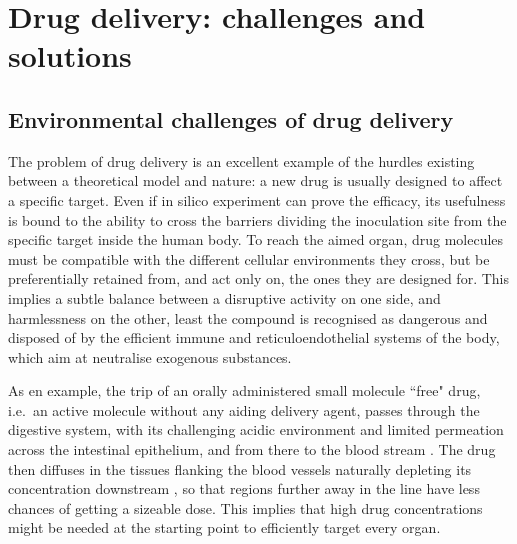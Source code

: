 \clearpage


\section{Drug delivery: challenges and solutions}

\subsection{Environmental challenges of drug delivery}
The problem of drug delivery is an excellent example of the hurdles existing between a theoretical model and nature: a new drug is usually designed to affect a specific target. Even if in silico experiment can prove the efficacy, its usefulness is bound to the ability to cross the barriers dividing the inoculation site from the specific target inside the human body.
%
To reach the aimed organ, drug molecules must be compatible with the different cellular environments they cross, but be preferentially retained from, and act only on, the ones they are designed for. This implies a subtle balance between a disruptive activity on one side, and harmlessness on the other, least the compound is recognised as dangerous and disposed of by the efficient immune and reticuloendothelial systems of the body, which aim at neutralise exogenous substances.

As en example, the trip of an orally  administered small molecule ``free" drug, i.e.\ an active molecule without any aiding delivery agent, passes through the digestive system, with its challenging acidic environment and limited permeation across the intestinal epithelium, and from there to the blood stream \cite{Masaoka2006, Mitragotri2014}. The drug then diffuses in the tissues flanking the blood vessels naturally depleting its concentration downstream \cite{Krol2012}, so that regions further away in the line have less chances of getting a sizeable dose. This implies that high drug concentrations might be needed at the starting point to efficiently target every organ.

